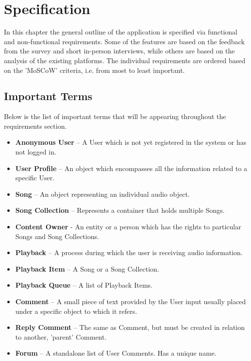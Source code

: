 \chapter{Specification}\label{chap:specs}

In this chapter the general outline of the application is specified via functional and non-functional requirements.
Some of the features are based on the feedback from the survey and short in-person interviews,
while others are based on the analysis of the existing platforms.
The individual requirements are ordered based on the 'MoSCoW' criteria, i.e. from most to least important.



\section{Important Terms}

Below is the list of important terms that will be appearing throughout the requirements section.

\begin{itemize}
    \item \textbf{Anonymous User} – A User which is not yet registered in the system or has not logged in.
    \item \textbf{User Profile} – An object which encompasses all the information related to a specific User.
    \item \textbf{Song} – An object representing an individual audio object.
    \item \textbf{Song Collection} – Represents a container that holds multiple Songs.
    \item \textbf{Content Owner} - An entity or a person which has the rights to particular Songs and Song Collections.
    \item \textbf{Playback} – A process during which the user is receiving audio information.
    \item \textbf{Playback Item} – A Song or a Song Collection.
    \item \textbf{Playback Queue} – A list of Playback Items.
    \item \textbf{Comment} – A small piece of text provided by the User input usually placed under a specific object to which it refers.
    \item \textbf{Reply Comment} – The same as Comment, but must be created in relation to another, 'parent' Comment.
    \item \textbf{Forum} – A standalone list of User Comments. Has a unique name.
\end{itemize}


